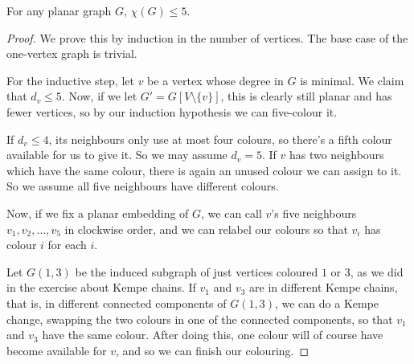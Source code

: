 \documentclass[nobib]{tufte-handout}
\begin{document}
\begin{theorem}
  For any planar graph $G$, $\chi(G) \leq 5$.

  \begin{proof}
    We prove this by induction in the number of vertices. The base case of the one-vertex graph is trivial.

    For the inductive step, let $v$ be a vertex whose degree in $G$ is minimal. We claim that $d_v \leq 5$. Now, if we let $G' = G[V \setminus \{v\}]$, this is clearly still planar and has fewer vertices, so by our induction hypothesis we can five-colour it.

    If $d_v \leq 4$, its neighbours only use at most four colours, so there's a fifth colour available for us to give it. So we may assume $d_v = 5$. If $v$ has two neighbours which have the same colour, there is again an unused colour we can assign to it. So we assume all five neighbours have different colours.

    Now, if we fix a planar embedding of $G$, we can call $v$'s five neighbours $v_1, v_2, \ldots, v_5$ in clockwise order, and we can relabel our colours so that $v_i$ has colour $i$ for each $i$.

    Let $G(1,3)$ be the induced subgraph of just vertices coloured $1$ or $3$, as we did in the exercise about Kempe chains. If $v_1$ and $v_3$ are in different Kempe chains, that is, in different connected components of $G(1,3)$, we can do a Kempe change, swapping the two colours in one of the connected components, so that $v_1$ and $v_3$ have the same colour. After doing this, one colour will of course have become available for $v$, and so we can finish our colouring.


\end{proof}
\end{theorem}
\end{document}
